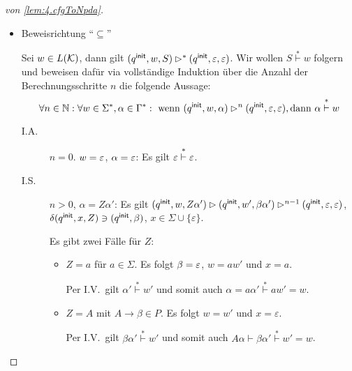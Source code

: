 \begin{proof}[von \autoref{lem:4.cfgToNpda}]
\begin{itemize}
        Per Konstruktion gilt $(\qinit, BC) \in \delta(\qinit, \Eps, A)$. 

        Ferner gilt per I.V., dass $(\qinit, Y(\mathcal{T}_1), B) \ConfRel^* (\qinit, \Eps, \Eps)$ und $(\qinit, Y(\mathcal{T}_2), C) \ConfRel^* (\qinit, \Eps, \Eps)$.

        Mit \autoref{lem:4.mehrKeller} folgt schließlich:
        \begin{align*}
          (\qinit, w, A) = (\qinit, Y(\mathcal{T}_1)Y(\mathcal{T}_2), A) &\ConfRel (\qinit, Y(\mathcal{T}_1)Y(\mathcal{T}_2), BC) \\
          &\ConfRel^* (\qinit, Y(\mathcal{T}_2), C) \\
          &\ConfRel^* (\qinit, \Eps, \Eps).
        \end{align*}
 \item Beweisrichtung  "`$\subseteq$"'
 
 Sei $w\in L(\mathcal{K})$, dann gilt $(q^\mathsf{init}, w, S) \rhd^* (q^\mathsf{init}, \varepsilon, \varepsilon)$.
 Wir wollen $S \stackrel{*}{\vdash} w$ folgern und beweisen dafür via vollständige Induktion über die Anzahl der Berechnungsschritte $n$ die folgende Aussage:
     \begin{displaymath}
      \forall n \in \mathbb{N}: \forall w \in \Sigma^*, \alpha \in \Gamma^*: \text{ wenn } (q^\mathsf{init}, w, \alpha) \rhd^n (q^\mathsf{init}, \varepsilon, \varepsilon), \text{dann } \alpha \stackrel{*}{\vdash} w
    \end{displaymath}
    
    \begin{description}
    \item[I.A.] $n = 0$.
      $w = \varepsilon$, $\alpha = \varepsilon$: Es gilt $\varepsilon \stackrel{*}{\vdash} \varepsilon$.

  \item[I.S.] $n > 0$, $\alpha = Z\alpha'$: Es gilt
    $(q^\mathsf{init},w,Z\alpha') \rhd (q^\mathsf{init}, w', \beta\alpha') \rhd^{n-1} (q^\mathsf{init}, \varepsilon, \varepsilon)$, \linebreak
    $\delta(q^\mathsf{init}, x, Z) \ni (q^\mathsf{init}, \beta)$, $x \in \Sigma \cup \{\varepsilon\}$.

    Es gibt zwei Fälle für $Z$:
    \begin{itemize}
    \item $Z = a$ für $a \in \Sigma$.
%
      Es folgt $\beta = \varepsilon$, $w = aw'$ und $x = a$.

      Per I.V.\ gilt $\alpha' \stackrel{*}{\vdash} w'$ und somit auch $\alpha = a\alpha' \stackrel{*}{\vdash}aw' = w$.
    \item $Z = A$ mit $A \to \beta \in P$.
%
      Es folgt $w = w'$ und $x = \varepsilon$.

      Per I.V.\ gilt $\beta\alpha' \stackrel{*}{\vdash} w'$ und somit auch $A\alpha \vdash \beta\alpha' \stackrel{*}{\vdash} w' = w$.
      \qedhere
    \end{itemize}
    \end{description}
\end{itemize}
\end{proof}

